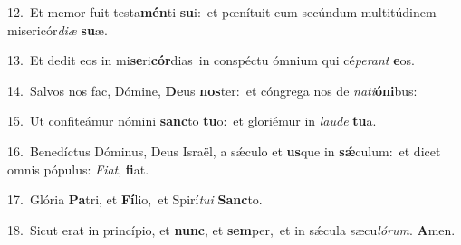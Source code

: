 {\numbfont\textcolor{\numbcolor}{12.}}~Et memor fuit testa\-\textbf{mén}\-ti \textbf{su}\-i:~\star et pœnítuit eum secúndum multitúdinem misericór\-\textit{di}\-\textit{æ} \textbf{su}\-æ.\par
{\numbfont\textcolor{\numbcolor}{13.}}~Et dedit eos in mi\-\textbf{se}\-ri\-\textbf{cór}\-dias~\star in conspéctu ómnium qui cé\-\textit{pe}\-\textit{rant} \textbf{e}\-os.\par
{\numbfont\textcolor{\numbcolor}{14.}}~Salvos nos fac, Dómine, \textbf{De}\-us \textbf{nos}\-ter:~\star et cóngrega nos de \textit{na}\-\textit{ti}\textbf{ó}\textbf{ni}bus:\par
{\numbfont\textcolor{\numbcolor}{15.}}~Ut confiteámur nómini \textbf{sanc}\-to \textbf{tu}\-o:~\star et gloriémur in \textit{lau}\-\textit{de} \textbf{tu}\-a.\par
{\numbfont\textcolor{\numbcolor}{16.}}~Benedíctus Dóminus, Deus Israël, a sǽculo et \textbf{us}\-que in \textbf{sǽ}\-culum:~\star et dicet omnis pópulus: \textit{Fi}\-\textit{at}, \textbf{fi}\-at.\par
{\numbfont\textcolor{\numbcolor}{17.}}~Glória \textbf{Pa}\-tri, et \textbf{Fí}\-lio,~\star et Spirí\-\textit{tu}\-\textit{i} \textbf{Sanc}\-to.\par
{\numbfont\textcolor{\numbcolor}{18.}}~Sicut erat in princípio, et \textbf{nunc}\-, et \textbf{sem}\-per,~\star et in sǽcula sæcu\-\textit{ló}\-\textit{rum}. \textbf{A}\-men.\par
